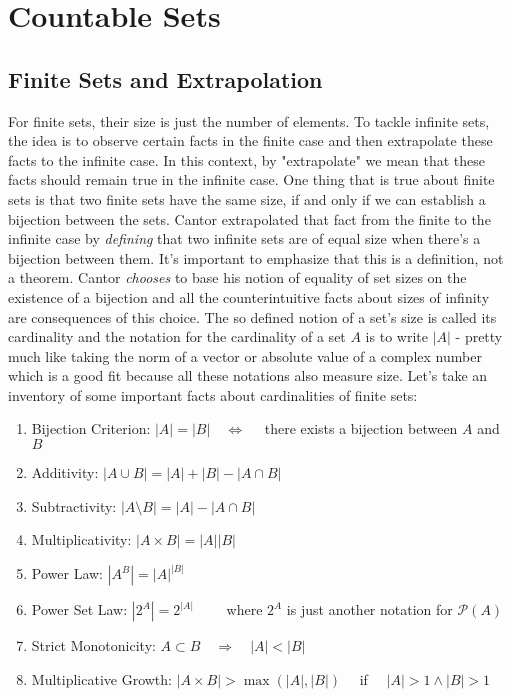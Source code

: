 \documentclass[12pt]{article}
\begin{document}


\section{Countable Sets}

\subsection{Finite Sets and Extrapolation}
For finite sets, their size is just the number of elements. To tackle infinite sets, the idea is to observe certain facts in the finite case and then extrapolate these facts to the infinite case. In this context, by "extrapolate" we mean that these facts should remain true in the infinite case. One thing that is true about finite sets is that two finite sets have the same size, if and only if we can establish a bijection between the sets. Cantor extrapolated that fact from the finite to the infinite case by \emph{defining} that two infinite sets are of equal size when there's a bijection between them. It's important to emphasize that this is a definition, not a theorem. Cantor \emph{chooses} to base his notion of equality of set sizes on the existence of a bijection and all the counterintuitive facts about sizes of infinity are consequences of this choice. The so defined notion of a set's size is called its cardinality and the notation for the cardinality of a set $A$ is to write $|A|$ - pretty much like taking the norm of a vector or absolute value of a complex number which is a good fit because all these notations also measure size. Let's take an inventory of some important facts about cardinalities of finite sets:
\begin{enumerate}
  \item Bijection Criterion: $|A| = |B| \quad  \Leftrightarrow  \quad$ there exists a bijection between $A$ and $B$
  \item Additivity: $|A \cup B| = |A| + |B| - |A \cap B|$ 
  \item Subtractivity:  $|A \setminus B| = |A| - |A \cap B|$ 
  \item Multiplicativity:  $|A \times B| = |A| |B|$ 
  \item Power Law: $|A^B| = |A|^{|B|}$
  \item Power Set Law: $|2^A| = 2^{|A|} \qquad$  where $2^A$ is just another notation for $\mathcal{P}(A)$
  \item Strict Monotonicity: $A \subset B \quad \Rightarrow \quad |A| < |B|$
  \item Multiplicative Growth: $|A \times B| > \max(|A|,|B|) \quad$ if $\quad |A| > 1 \wedge |B| > 1$
\end{enumerate}
\end{document}
